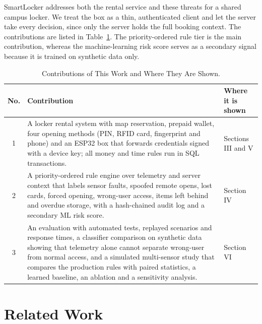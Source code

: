 \documentclass[journal,onecolumn]{IEEEtran}
\begin{document}
SmartLocker addresses both the rental service and these threats for a shared campus locker. We treat the box as a thin,
authenticated client and let the server take every decision, since only the server holds the full booking context.
The contributions are listed in Table~\ref{tab:contrib}. The priority-ordered rule tier is the main
contribution, whereas the machine-learning risk score serves as a secondary signal because it is trained on synthetic
data only.

\begin{table}[!htbp]
\renewcommand{\arraystretch}{1.02}
\centering
\small
\caption{Contributions of This Work and Where They Are Shown.}
\label{tab:contrib}
\vspace{5pt}
\begin{tabular}{c p{11.9cm} p{2.7cm}}
\hline
No. & Contribution & Where it is shown \\
\hline
\rule{0pt}{2.6ex}1 & A locker rental system with map reservation, prepaid wallet, four opening methods (PIN, RFID card, fingerprint and
    phone) and an ESP32 box that forwards credentials signed with a device key; all money and time rules run in SQL transactions. & Sections III and V \\
2 & A priority-ordered rule engine over telemetry and server context that labels sensor faults, spoofed remote opens,
    lost cards, forced opening, wrong-user access, items left behind and overdue storage, with a hash-chained audit log and a secondary ML risk score. & Section IV \\
3 & An evaluation with automated tests, replayed scenarios and response times, a classifier comparison on synthetic
    data showing that telemetry alone cannot separate wrong-user from normal access, and a simulated multi-sensor
    study that compares the production rules with paired statistics, a learned baseline, an ablation and a
    sensitivity analysis. & Section VI \\
\hline
\end{tabular}
\end{table}

\section{Related Work}
\end{document}
